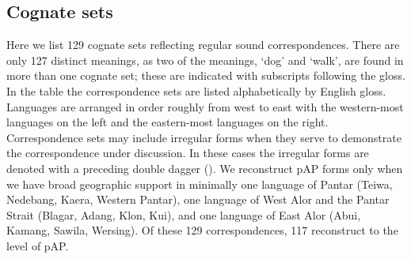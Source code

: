 \subsection*{Cognate sets}

Here we list 129 cognate sets reflecting regular sound correspondences. There are only 127 distinct meanings, as two of the meanings, `dog' and `walk', are found in more than one cognate set; these are indicated with subscripts following the gloss. In the table the correspondence sets are listed alphabetically by English gloss. Languages are arranged in order roughly from west to east with the western-most languages on the left and the eastern-most languages on the right. Correspondence sets may include irregular forms when they serve to demonstrate the correspondence under discussion. In these cases the irregular forms are denoted with a preceding double dagger ({\ddag}). We reconstruct pAP forms only when we have broad geographic support in minimally one language of Pantar (Teiwa, Nedebang, Kaera, Western Pantar), one language of West Alor and the Pantar Strait (Blagar, Adang, 
Klon, Kui), and one language of East Alor (Abui, Kamang, Sawila, Wersing). Of these 129 correspondences, 117 reconstruct to the level of pAP.



